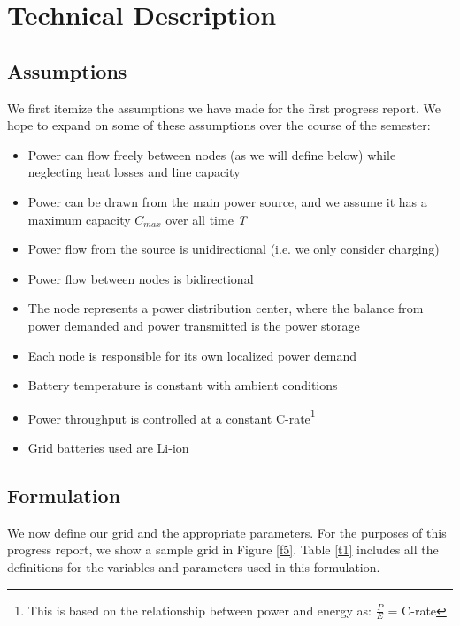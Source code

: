 \documentclass[10]{IEEEtran}
\begin{document}
	\section{Technical Description}
	\subsection{Assumptions}
	We first itemize the assumptions we have made for the first progress report. We hope to expand on some of these assumptions over the course of the semester:
	
	\begin{itemize}
		\item Power can flow freely between nodes (as we will define below) while neglecting heat losses and line capacity
		\item Power can be drawn from the main power source, and we assume it has a maximum capacity $C_{max}$ over all time \textit{T}
		\item Power flow from the source is unidirectional (i.e. we only consider charging)
		\item Power flow between nodes is bidirectional
		\item The node represents a power distribution center, where the balance from power demanded and power transmitted is the power storage
		\item Each node is responsible for its own localized power demand
		\item Battery temperature is constant with ambient conditions
		\item Power throughput is controlled at a constant C-rate\footnote{This is based on the relationship between power and energy as: $\frac{P}{E}$ = C-rate}
		\item Grid batteries used are Li-ion
	\end{itemize}
	\subsection{Formulation}
	We now define our grid and the appropriate parameters. For the purposes of this progress report, we show a sample grid in Figure \ref{f5}. Table \ref{t1} includes all the definitions for the variables and parameters used in this formulation.
	
\end{document}
